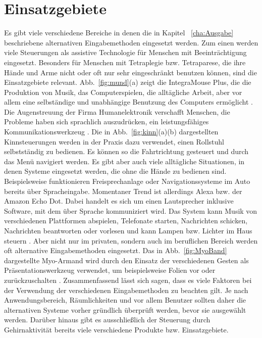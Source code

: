 \section{Einsatzgebiete}
%
%
Es gibt viele verschiedene Bereiche in denen die in Kapitel ~\ref{cha:Ausgabe} beschriebene alternativen Eingabemethoden eingesetzt werden.
\newline \newline
Zum einen werden viele Steuerungen als assistive Technologie für Menschen mit Beeinträchtigung eingesetzt. Besonders für Menschen mit Tetraplegie bzw. Tetraparese, die ihre Hände und Arme nicht oder oft nur sehr eingeschränkt benutzen können, sind die Einsatzgebiete relevant. Abb.~\ref{fig:mund}(a) zeigt die IntegraMouse Plus, die die Produktion von Musik, das Computerspielen, die alltägliche Arbeit, aber vor allem eine selbständige und unabhängige Benutzung des Computers ermöglicht \cite{INTEGRA_Stories}. Die Augenstreuung der Firma Humanelektronik verschafft Menschen, die Probleme haben sich sprachlich auszudrücken, ein leistungsfähiges Kommunikationswerkzeug \cite{SEETECH}. Die in Abb.~\ref{fig:kinn}(a)(b) dargestellten Kinnsteuerungen werden in der Praxis dazu verwendet, einen Rollstuhl selbstständig zu bedienen. Es können so die Fahrtrichtung gesteuert und durch das Menü navigiert werden.
\newline \newline
Es gibt aber auch viele alltägliche Situationen, in denen Systeme eingesetzt werden, die ohne die Hände zu bedienen sind. Beispielsweise funktionieren Freisprechanlage oder Navigationssysteme im Auto bereits über Spracheingabe. Momentaner Trend ist allerdings Alexa bzw. der Amazon Echo Dot. Dabei handelt es sich um einen Lautsprecher inklusive Software, mit dem über Sprache kommuniziert wird. Das System kann Musik von verschiedenen Plattformen abspielen, Telefonate starten, Nachrichten schicken, Nachrichten beantworten oder vorlesen und kann Lampen bzw. Lichter im Haus steuern \cite{Alexa}. 
\newline \newline
Aber nicht nur im privaten, sondern auch im beruflichen Bereich werden oft alternative Eingabemethoden eingesetzt. Das in Abb.~\ref{fig:MyoBand} dargestellte Myo-Armand wird durch den Einsatz der verschiedenen Gesten als Präsentationswerkzeug verwendet, um beispielsweise Folien vor oder zurückzuschalten \cite{myoBand}.
\newline \newline \newline
Zusammenfassend lässt sich sagen, dass es viele Faktoren bei der Verwendung der verschiedenen Eingabemethoden zu beachten gilt. Je nach Anwendungsbereich, Räumlichkeiten und vor allem Benutzer sollten daher die alternativen Systeme vorher gründlich überprüft werden, bevor sie ausgewählt werden. Darüber hinaus gibt es ausschließlich der Steuerung durch Gehirnaktivität bereits viele verschiedene Produkte bzw. Einsatzgebiete.
